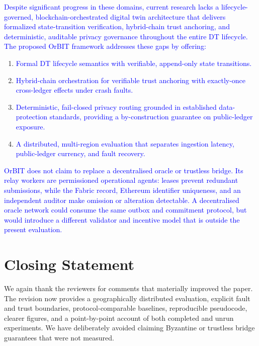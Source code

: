 \documentclass[11pt]{article}
\newcounter{reviewer}
\newcounter{point}[reviewer]
\begin{document}
\textcolor{blue}{Despite significant progress in these domains, current research lacks a lifecycle-governed,
blockchain-orchestrated digital twin architecture that delivers formalized state-transition
verification, hybrid-chain trust anchoring, and deterministic, auditable privacy governance
throughout the entire DT lifecycle. The proposed OrBIT framework addresses these gaps by
offering:}
\begin{enumerate}
    \item \textcolor{blue}{Formal DT lifecycle semantics with verifiable, append-only state transitions.}
    \item \textcolor{blue}{Hybrid-chain orchestration for verifiable trust anchoring with exactly-once cross-ledger effects under crash faults.}
    \item \textcolor{blue}{Deterministic, fail-closed privacy routing grounded in established data-protection standards, providing a by-construction guarantee on public-ledger exposure.}
    \item \textcolor{blue}{A distributed, multi-region evaluation that separates ingestion latency, public-ledger currency, and fault recovery.}
\end{enumerate}
\textcolor{blue}{OrBIT does not claim to replace a decentralised oracle or trustless bridge. Its relay workers are permissioned operational agents: leases prevent redundant submissions, while the Fabric record, Ethereum identifier uniqueness, and an independent auditor make omission or alteration detectable. A decentralised oracle network could consume the same outbox and commitment protocol, but would introduce a different validator and incentive model that is outside the present evaluation.}



\section*{Closing Statement}
We again thank the reviewers for comments that materially improved the paper.
The revision now provides a geographically distributed evaluation, explicit
fault and trust boundaries, protocol-comparable baselines, reproducible
pseudocode, clearer figures, and a point-by-point account of both completed and
unrun experiments. We have deliberately avoided claiming Byzantine or trustless
bridge guarantees that were not measured.
\end{document}
